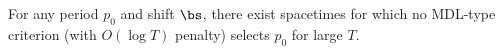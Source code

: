 \begin{theorem}[Nonidentifiability]\label{thm:nonident}
For any period $p_0$ and shift $\bs$, there exist spacetimes for which no MDL-type criterion (with $O(\log T)$ penalty) selects $p_0$ for large $T$.
\end{theorem}
